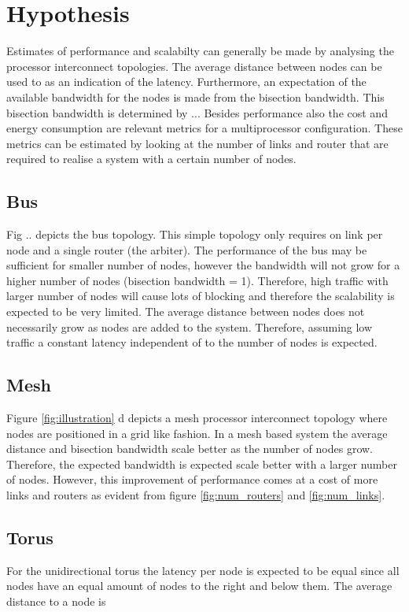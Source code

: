 \documentclass[journal,10pt,twoside, a4paper]{IEEEtran}
\begin{document}
\section{Hypothesis}

Estimates of performance and scalabilty can generally be made by analysing the processor interconnect topologies. The average distance between nodes can be used to as an indication of the latency. Furthermore, an expectation of the available bandwidth for the nodes is made from the bisection bandwidth. This bisection bandwidth is determined by ... Besides performance also the cost and energy consumption are relevant metrics for a multiprocessor configuration. These metrics can be estimated by looking at the number of links and router that are required to realise a system with a certain number of nodes.      

\subsection{Bus}
Fig .. depicts the bus topology. This simple topology only requires on link per node and a single router (the arbiter). The performance of the bus may be sufficient for smaller number of nodes, however the bandwidth will not grow for a higher number of nodes (bisection bandwidth = 1). Therefore, high traffic with larger number of nodes will cause lots of blocking and therefore the scalability is expected to be very limited. The average distance between nodes does not necessarily grow as nodes are added to the system. Therefore, assuming low traffic a constant latency independent of to the number of nodes is expected.
\subsection{Mesh}
Figure \ref{fig:illustration} d depicts a mesh processor interconnect topology where nodes are positioned in a grid like fashion. In a mesh based system the average distance and bisection bandwidth scale better as the number of nodes grow. Therefore, the expected bandwidth is expected scale better with a larger number of nodes. However, this improvement of performance comes at a cost of more links and routers as evident from figure \ref{fig:num_routers} and \ref{fig:num_links}.  

\subsection{Torus}
For the unidirectional torus the latency per node is expected to be equal since all nodes have an equal amount of nodes to the right and below them. The average distance to a node is  
\end{document}
